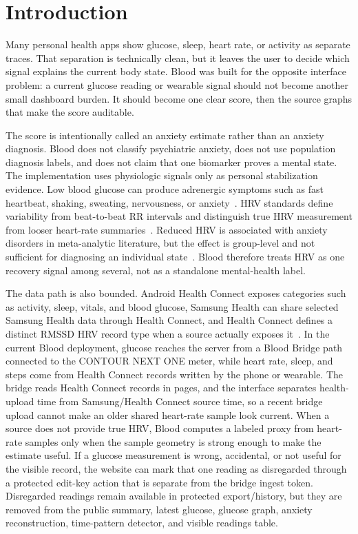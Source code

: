 \documentclass[12pt,letterpaper]{article}
\begin{document}
\newpage
\pagestyle{fancy}

\section{Introduction}

Many personal health apps show glucose, sleep, heart rate, or activity as separate traces. That separation is technically clean, but it leaves the user to decide which signal explains the current body state. Blood was built for the opposite interface problem: a current glucose reading or wearable signal should not become another small dashboard burden. It should become one clear score, then the source graphs that make the score auditable.

The score is intentionally called an anxiety estimate rather than an anxiety diagnosis. Blood does not classify psychiatric anxiety, does not use population diagnosis labels, and does not claim that one biomarker proves a mental state. The implementation uses physiologic signals only as personal stabilization evidence. Low blood glucose can produce adrenergic symptoms such as fast heartbeat, shaking, sweating, nervousness, or anxiety~\cite{cdc2024hypoglycemia}. HRV standards define variability from beat-to-beat RR intervals and distinguish true HRV measurement from looser heart-rate summaries~\cite{taskforce1996hrv}. Reduced HRV is associated with anxiety disorders in meta-analytic literature, but the effect is group-level and not sufficient for diagnosing an individual state~\cite{chalmers2014anxiety}. Blood therefore treats HRV as one recovery signal among several, not as a standalone mental-health label.

The data path is also bounded. Android Health Connect exposes categories such as activity, sleep, vitals, and blood glucose, Samsung Health can share selected Samsung Health data through Health Connect, and Health Connect defines a distinct RMSSD HRV record type when a source actually exposes it~\cite{androidhealthconnect2026,androidhrvrmssd2026,samsunghealthconnect2025}. In the current Blood deployment, glucose reaches the server from a Blood Bridge path connected to the CONTOUR NEXT ONE meter, while heart rate, sleep, and steps come from Health Connect records written by the phone or wearable. The bridge reads Health Connect records in pages, and the interface separates health-upload time from Samsung/Health Connect source time, so a recent bridge upload cannot make an older shared heart-rate sample look current. When a source does not provide true HRV, Blood computes a labeled proxy from heart-rate samples only when the sample geometry is strong enough to make the estimate useful. If a glucose measurement is wrong, accidental, or not useful for the visible record, the website can mark that one reading as disregarded through a protected edit-key action that is separate from the bridge ingest token. Disregarded readings remain available in protected export/history, but they are removed from the public summary, latest glucose, glucose graph, anxiety reconstruction, time-pattern detector, and visible readings table.
\end{document}
